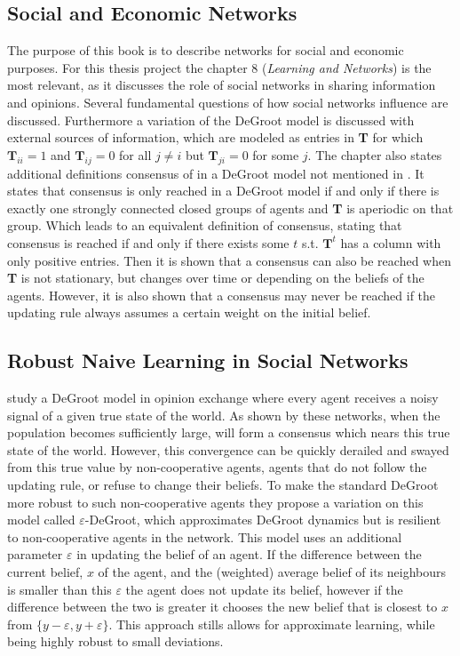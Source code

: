 \documentclass{article}
\begin{document}
\subsection*{Social and Economic Networks \cite{jackson2010social}}
The purpose of this book is to describe networks for social and economic purposes. For this thesis project the chapter 8 (\textit{Learning and Networks}) is the most relevant, as it discusses the role of social networks in sharing information and opinions. Several fundamental questions of how social networks influence are discussed.
Furthermore a variation of the DeGroot model is discussed with external sources of information, which are modeled as entries in \textbf{T} for which $\textbf{T}_{ii}=1$ and $\textbf{T}_{ij}=0$ for all $j\neq i$ but $\textbf{T}_{ji}=0$ for some $j$. \newline
The chapter also states additional definitions consensus of in a DeGroot model not mentioned in \cite{golub2010naive}. It states that consensus is only reached in a DeGroot model if and only if there is exactly one strongly connected closed groups of agents and \textbf{T} is aperiodic on that group. Which leads to an equivalent definition of consensus, stating that consensus is reached if and only if there exists some $t$ s.t. $\textbf{T}^{t}$ has a column with only positive entries. \newline
Then it is shown that a consensus can also be reached when \textbf{T} is not stationary, but changes over time or depending on the beliefs of the agents. However, it is also shown that a consensus may never be reached if the updating rule always assumes a certain weight on the initial belief.

\subsection*{Robust Naive Learning in Social Networks \cite{amir2021robust}}
\cite{amir2021robust} study a DeGroot model in opinion exchange where every agent receives a noisy signal of a given true state of the world. As shown by \cite{golub2010naive} these networks, when the population becomes sufficiently large, will form a consensus which nears this true state of the world. However, this convergence can be quickly derailed and swayed from this true value by non-cooperative agents, agents that do not follow the updating rule, or refuse to change their beliefs.
To make the standard DeGroot more robust to such non-cooperative agents they propose a variation on this model called $\varepsilon$-DeGroot, which approximates DeGroot dynamics but is resilient to non-cooperative agents in the network.
This model uses an additional parameter $\varepsilon$ in updating the belief of an agent. If the difference between the current belief, $x$ of the agent, and the (weighted) average belief of its neighbours is smaller than this $\varepsilon$ the agent does not update its belief, however if the difference between the two is greater it chooses the new belief that is closest to $x$ from $\{y-\varepsilon, y+\varepsilon\}$. This approach stills allows for approximate learning, while being highly robust to small deviations.
\newpage
\end{document}
